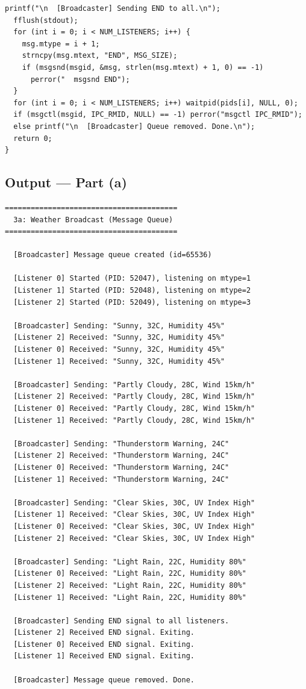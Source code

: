 \documentclass[11pt,a4paper]{article}
\begin{document}
\begin{codebox}
\begin{lstlisting}[style=cstyle]
  printf("\n  [Broadcaster] Sending END to all.\n");
  fflush(stdout);
  for (int i = 0; i < NUM_LISTENERS; i++) {
    msg.mtype = i + 1;
    strncpy(msg.mtext, "END", MSG_SIZE);
    if (msgsnd(msgid, &msg, strlen(msg.mtext) + 1, 0) == -1)
      perror("  msgsnd END");
  }
  for (int i = 0; i < NUM_LISTENERS; i++) waitpid(pids[i], NULL, 0);
  if (msgctl(msgid, IPC_RMID, NULL) == -1) perror("msgctl IPC_RMID");
  else printf("\n  [Broadcaster] Queue removed. Done.\n");
  return 0;
}
\end{lstlisting}
\end{codebox}

\subsection*{Output --- Part (a)}
\begin{outputbox}
\begin{lstlisting}[style=outputstyle]
========================================
  3a: Weather Broadcast (Message Queue)
========================================

  [Broadcaster] Message queue created (id=65536)

  [Listener 0] Started (PID: 52047), listening on mtype=1
  [Listener 1] Started (PID: 52048), listening on mtype=2
  [Listener 2] Started (PID: 52049), listening on mtype=3

  [Broadcaster] Sending: "Sunny, 32C, Humidity 45%"
  [Listener 2] Received: "Sunny, 32C, Humidity 45%"
  [Listener 0] Received: "Sunny, 32C, Humidity 45%"
  [Listener 1] Received: "Sunny, 32C, Humidity 45%"

  [Broadcaster] Sending: "Partly Cloudy, 28C, Wind 15km/h"
  [Listener 2] Received: "Partly Cloudy, 28C, Wind 15km/h"
  [Listener 0] Received: "Partly Cloudy, 28C, Wind 15km/h"
  [Listener 1] Received: "Partly Cloudy, 28C, Wind 15km/h"

  [Broadcaster] Sending: "Thunderstorm Warning, 24C"
  [Listener 2] Received: "Thunderstorm Warning, 24C"
  [Listener 0] Received: "Thunderstorm Warning, 24C"
  [Listener 1] Received: "Thunderstorm Warning, 24C"

  [Broadcaster] Sending: "Clear Skies, 30C, UV Index High"
  [Listener 1] Received: "Clear Skies, 30C, UV Index High"
  [Listener 0] Received: "Clear Skies, 30C, UV Index High"
  [Listener 2] Received: "Clear Skies, 30C, UV Index High"

  [Broadcaster] Sending: "Light Rain, 22C, Humidity 80%"
  [Listener 0] Received: "Light Rain, 22C, Humidity 80%"
  [Listener 2] Received: "Light Rain, 22C, Humidity 80%"
  [Listener 1] Received: "Light Rain, 22C, Humidity 80%"

  [Broadcaster] Sending END signal to all listeners.
  [Listener 2] Received END signal. Exiting.
  [Listener 0] Received END signal. Exiting.
  [Listener 1] Received END signal. Exiting.

  [Broadcaster] Message queue removed. Done.
\end{lstlisting}
\end{outputbox}
\end{document}
